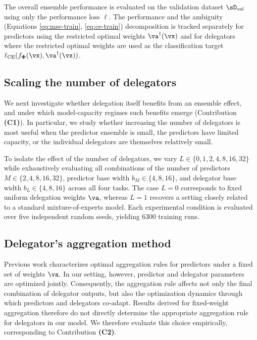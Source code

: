 \documentclass[10pt]{article} %
\def\vPhi{{\bm{\Phi}}}
\begin{document}
The overall ensemble performance is evaluated on the validation dataset $\sD_{\mathrm{val}}$ using only the performance loss $\ell$. The performance and the ambiguity (Equations \ref{eq:mse-train}, \ref{eq:ce-train}) decomposition is tracked separately for predictors using the restricted optimal weights $\va^\dagger(\vx)$ and for delegators where the restricted optimal weights are used as the classification target  $\ell_{\text{CE}} (f_{\vPhi}(\vx), \va^\dagger(\vx))$.

\subsection{Scaling the number of delegators} \label{sec:exp-scaling}

We next investigate whether delegation itself benefits from an ensemble effect, and under which model-capacity regimes such benefits emerge (Contribution \textbf{(C1)}). In particular, we study whether increasing the number of delegators is most useful when the predictor ensemble is small, the predictors have limited capacity, or the individual delegators are themselves relatively small.

To isolate the effect of the number of delegators, we vary $L \in \{0,1,2,4,8,16,32\}$ while exhaustively evaluating all combinations of the number of predictors $M \in \{2,4,8,16,32\}$, predictor base width $b_M \in \{4,8,16\}$, and delegator base width $b_L \in \{4,8,16\}$ across all four tasks. The case $L=0$ corresponds to fixed uniform delegation weights $\va$, whereas $L=1$ recovers a setting closely related to a standard mixture-of-experts model. Each experimental condition is evaluated over five independent random seeds, yielding $6300$ training runs.

\subsection{Delegator's aggregation method} \label{sec:exp-agg}

Previous work \citep{pmlr-v151-ortega22a, wood2023unified} characterizes optimal aggregation rules for predictors under a fixed set of weights $\va$. In our setting, however, predictor and delegator parameters are optimized jointly. Consequently, the aggregation rule affects not only the final combination of delegator outputs, but also the optimization dynamics through which predictors and delegators co-adapt. Results derived for fixed-weight aggregation therefore do not directly determine the appropriate aggregation rule for delegators in our model. We therefore evaluate this choice empirically, corresponding to Contribution \textbf{(C2)}.
\end{document}
